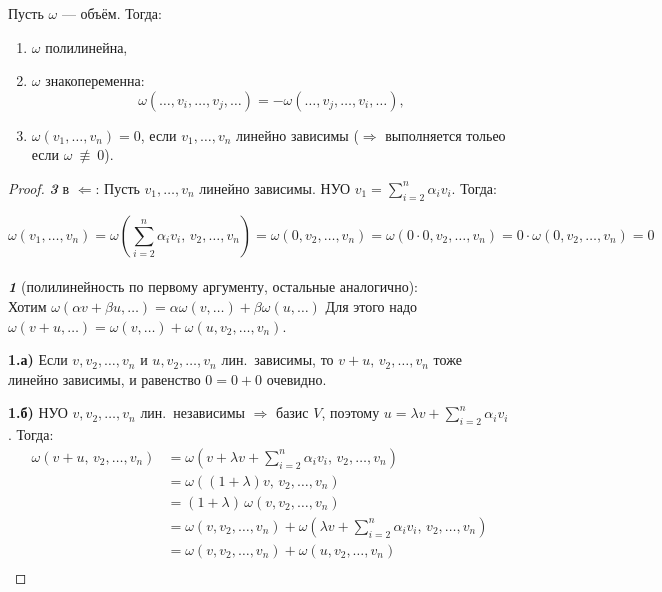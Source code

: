 \begin{stmt}
    Пусть $\omega$ --- объём. Тогда:
    \begin{enumerate}[label=\textbf{\arabic*.}]
        \item $\omega$ полилинейна,
        \item $\omega$ знакопеременна:
        \[
            \omega(\dots, v_i, \dots, v_j, \dots) = -\omega(\dots, v_j, \dots, v_i, \dots),
        \]
        \item $\omega(v_1, \dots, v_n) = 0$, если $v_1, \dots, v_n$ линейно зависимы (\textcircled{$\Rightarrow$} выполняется тольео если $\omega \ \not\equiv \ 0$).
    \end{enumerate}

    \begin{proof}
        \textbf{\emph{3}} в \textcircled{$\Leftarrow$}: Пусть $v_1, \dots, v_n$ линейно зависимы. НУО $v_1 = \sum_{i=2}^{n} \alpha_i v_i$. Тогда:
    
        \[  
            \omega(v_1, \dots, v_n)
            = \omega\!\left(\sum_{i=2}^{n} \alpha_i v_i,\, v_2, \dots, v_n\right)
            = \omega(0, v_2, \dots, v_n)
            = \omega(0 \cdot 0, v_2, \dots, v_n)
            = 0 \cdot \omega(0, v_2, \dots, v_n) = 0        
        \]
        \\

        \textbf{\emph{1}} (полилинейность по первому аргументу, остальные аналогично): \\
        Хотим $\omega(\alpha v + \beta u, \dots) = \alpha \omega(v, \dots) + \beta \omega(u, \dots)$
        Для этого надо $\omega(v + u, \dots) = \omega(v, \dots) + \omega(u, v_2, \dots, v_n)$.

        \textbf{1.а)} Если $v, v_2, \dots, v_n$ и $u, v_2, \dots, v_n$ лин.\ зависимы,
        то $v + u,\, v_2, \dots, v_n$ тоже линейно зависимы, и равенство $0 = 0 + 0$ очевидно.

        \textbf{1.б)} НУО $v, v_2, \dots, v_n$ лин.\ независимы $\Rightarrow$ базис $V$,
        поэтому $u = \lambda v + \sum_{i=2}^{n} \alpha_i v_i$. Тогда:
        \begin{align*}
            \omega\!\left(v + u,\, v_2, \dots, v_n\right)
            &= \omega\!\left(v + \lambda v + \sum_{i=2}^{n}\alpha_i v_i,\, v_2, \dots, v_n\right) \\
            &= \omega\!\left((1+\lambda)v,\, v_2, \dots, v_n\right) \\
            &= (1+\lambda)\,\omega(v, v_2, \dots, v_n) \\
            &= \omega(v, v_2, \dots, v_n) + \omega\!\left(\lambda v + \sum_{i=2}^{n}\alpha_i v_i,\, v_2, \dots, v_n\right) \\
            &= \omega(v, v_2, \dots, v_n) + \omega(u, v_2, \dots, v_n) \\
        \end{align*}


\end{proof}
\end{stmt}
